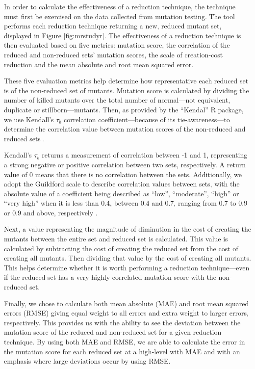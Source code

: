 In order to calculate the effectiveness of a reduction technique, the technique
must first be exercised on the data collected from mutation testing. The \mr tool
performs each reduction technique returning a new, reduced mutant set,
displayed in Figure \ref{fig:mrstudyr}. The effectiveness of a reduction technique is then evaluated
based on five metrics: mutation score, the correlation of the reduced and non-reduced sets' mutation scores,
the scale of creation-cost reduction and the mean absolute and root mean squared error.

These five evaluation metrics help determine how representative each reduced
set is of the non-reduced set of mutants. Mutation score is calculated
by dividing the number of killed mutants over the total number of normal---not
equivalent, duplicate or stillborn---mutants. Then, as provided by the ``Kendal'' R package,
we use Kendall's $\tau_b$ correlation coefficient---because of its tie-awareness---to
determine the correlation value between mutation scores of the non-reduced and reduced sets \cite{mcleod2005kendall}.

Kendall's $\tau_b$ returns a measurement of correlation between -1 and 1, representing
a strong negative or positive correlation between two sets, respectively. A return value
of 0 means that there is no correlation between the sets. Additionally, we adopt the
Guildford scale to describe correlation values between sets, with the absolute value
of a coefficient being described as ``low'', ``moderate'', ``high'' or ``very high'' when
it is less than 0.4, between 0.4 and 0.7, ranging from 0.7 to 0.9 or 0.9 and above, respectively \cite{inozemtseva2014coverage}.

Next, a value representing the magnitude of diminution in the cost of
creating the mutants between the entire set
and reduced set is calculated. This value is calculated by subtracting
the cost of creating the reduced set from the cost of creating all mutants. Then
dividing that value by the cost of creating all mutants. This helps
determine whether it is worth performing a reduction technique---even if the
reduced set has a very highly correlated mutation score with the non-reduced set.

Finally, we chose to calculate both mean absolute (MAE) and root mean
squared errors (RMSE) giving equal weight to
all errors and extra weight to larger errors, respectively. This provides
us with the ability to see the deviation between the mutation score of the reduced and
non-reduced set for a given reduction technique. By using both MAE and RMSE,
we are able to calculate the error in the mutation score for each reduced set
at a high-level with MAE and with an emphasis where large deviations occur by using RMSE.

